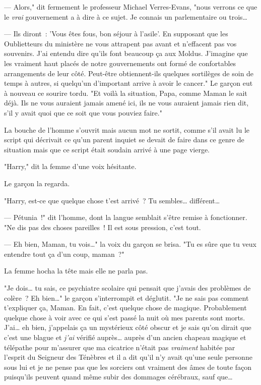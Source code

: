 --- Alors," dit fermement le professeur Michael Verres-Evans, "nous verrons ce que le \emph{vrai} gouvernement a à dire à ce sujet. Je connais un parlementaire ou trois…

--- Ils diront~: 'Vous êtes fous, bon séjour à l'asile'. En supposant que les Oublietteurs du ministère ne vous attrapent pas avant et n'effacent pas vos souvenirs. J'ai entendu dire qu'ils font beaucoup ça aux Moldus. J'imagine que les vraiment haut placés de notre gouvernements ont formé de confortables arrangements de leur côté. Peut-être obtiennent-ils quelques sortilèges de soin de temps à autres, si quelqu'un d'important arrive à avoir le cancer." Le garçon eut à nouveau ce sourire tordu. "Et voilà la situation, Papa, comme Maman le sait déjà. Ils ne vous auraient jamais amené ici, ils ne vous auraient jamais rien dit, s'il y avait quoi que ce soit que vous pouviez faire."

La bouche de l'homme s'ouvrit mais aucun mot ne sortit, comme s'il avait lu le script qui décrivait ce qu'un parent inquiet se devait de faire dans ce genre de situation mais que ce script était soudain arrivé à une page vierge.

"Harry," dit la femme d'une voix hésitante.

Le garçon la regarda.

"Harry, est-ce que quelque chose t'est arrivé~? Tu sembles… différent…

--- Pétunia~!" dit l'homme, dont la langue semblait s'être remise à fonctionner. "Ne dis pas des choses pareilles~! Il est sous pression, c'est tout.

--- Eh bien, Maman, tu vois…" la voix du garçon se brisa. "Tu es sûre que tu veux entendre tout ça d'un coup, maman~?"

La femme hocha la tête mais elle ne parla pas.

"Je dois… tu sais, ce psychiatre scolaire qui pensait que j'avais des problèmes de colère~? Eh bien…" le garçon s'interrompit et déglutit. "Je ne sais pas comment t'expliquer ça, Maman. En fait, c'est quelque chose de magique. Probablement quelque chose à voir avec ce qui s'est passé la nuit où mes parents sont morts. J'ai… eh bien, j'appelais ça un mystérieux côté obscur et je sais qu'on dirait que c'est une blague et \emph{j'ai} vérifié auprès… auprès d'un ancien chapeau magique et télépathe pour m'assurer que ma cicatrice n'était pas \emph{vraiment} habitée par l'esprit du Seigneur des Ténèbres et il a dit qu'il n'y avait qu'une seule personne sous lui et je ne pense pas que les sorciers ont vraiment des âmes de toute façon puisqu'ils peuvent quand même subir des dommages cérébraux, sauf que…

